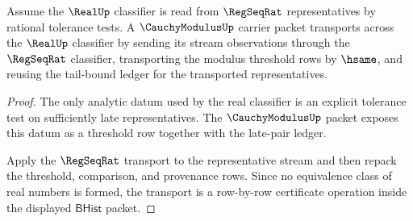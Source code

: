 \begin{theorem}
\label{thm:cauchymodulus-real-classifier-transport-obligation}
Assume the $\RealUp$ classifier is read from $\RegSeqRat$ representatives by
rational tolerance tests. A $\CauchyModulusUp$ carrier packet transports across
the $\RealUp$ classifier by sending its stream observations through the
$\RegSeqRat$ classifier, transporting the modulus threshold rows by $\hsame$,
and reusing the tail-bound ledger for the transported representatives.
\end{theorem}
\begin{proof}
The only analytic datum used by the real classifier is an explicit tolerance
test on sufficiently late representatives. The $\CauchyModulusUp$ packet
exposes this datum as a threshold row together with the late-pair ledger.

Apply the $\RegSeqRat$ transport to the representative stream and then repack
the threshold, comparison, and provenance rows. Since no equivalence class of
real numbers is formed, the transport is a row-by-row certificate operation
inside the displayed $\mathsf{BHist}$ packet.
\end{proof}

